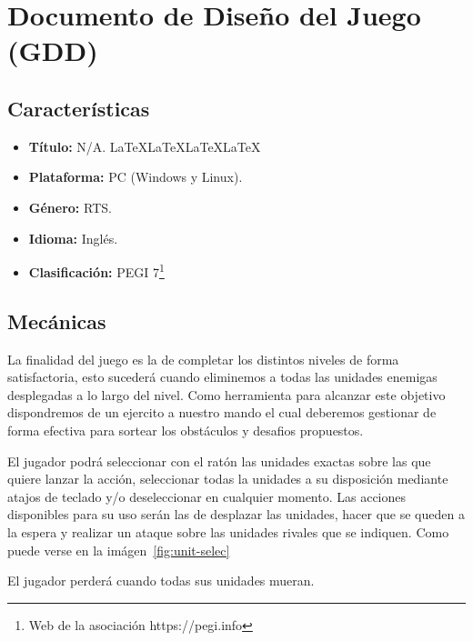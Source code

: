 \chapter{Documento de Diseño del Juego (GDD)}
\section{Características}
\begin{itemize}
	\item \textbf{Título:} N/A. \LaTeX \LaTeX \LaTeX \LaTeX
	\item \textbf{Plataforma:} \ac{PC} (Windows y Linux).
	\item \textbf{Género:} \acf{RTS}.
	\item \textbf{Idioma:} Inglés.
	\item \textbf{Clasificación:} PEGI 7\footnote{Web de la asociación https://pegi.info}
\end{itemize}

\section{Mecánicas}
La finalidad del juego es la de completar los distintos niveles de forma satisfactoria,
esto sucederá cuando eliminemos a todas las unidades enemigas desplegadas a lo largo del
nivel. Como herramienta para alcanzar este objetivo dispondremos de un ejercito a nuestro
mando el cual deberemos gestionar de forma efectiva para sortear los obstáculos y
desafios propuestos.

El jugador podrá seleccionar con el ratón las unidades exactas sobre las que quiere
lanzar la acción, seleccionar todas la unidades a su disposición mediante
atajos de teclado y/o deseleccionar en cualquier momento. Las acciones disponibles para
su uso serán las de desplazar las unidades, hacer que se queden a la espera y realizar
un ataque sobre las unidades rivales que se indiquen. Como puede verse en la 
imágen~\ref{fig:unit-selec}

El jugador perderá cuando todas sus unidades mueran.

